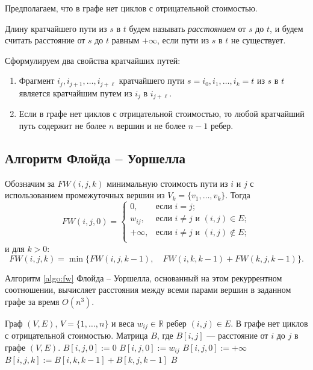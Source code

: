 \documentclass[a4paper,12pt]{article}
\begin{document}
Предполагаем, что в графе нет циклов с отрицательной стоимостью.

Длину кратчайшего пути из $s$ в $t$ будем называть \emph{расстоянием} от $s$ до $t$, и будем считать расстояние от $s$ до $t$ равным $+\infty$, если пути из $s$ в $t$ не существует.

Сформулируем два свойства кратчайших путей:
\begin{enumerate}
	\item Фрагмент $i_j, i_{j+1}, \dots, i_{j+\ell}$ кратчайшего пути $s = i_0, i_1, \ldots, i_k = t$ из $s$ в $t$ является кратчайшим путем из $i_j$ в $i_{j+\ell}$.
	\item Если в графе нет циклов с отрицательной стоимостью, то любой кратчайший путь содержит не более $n$ вершин и не более $n - 1$ ребер.
\end{enumerate}


\subsection{Алгоритм Флойда -- Уоршелла}
Обозначим за $FW(i, j, k)$ минимальную стоимость пути из $i$ и $j$ с использованием промежуточных вершин из $V_k = \{v_1, \ldots, v_k\}$. Тогда
\[FW(i, j, 0) =
	\begin{cases}
		0, & \text{если }i = j;\\
		w_{ij}, & \text{если }i \neq j\text{ и }(i, j) \in E;\\
		+\infty, & \text{если }i \neq j\text{ и }(i, j) \not\in E;\\
	\end{cases}
\]
и для $k > 0$:
\[FW(i, j, k) = \min\{FW(i, j, k-1), \quad FW(i, k, k-1) + FW(k, j, k - 1)\}.\]

Алгоритм \ref{algo:fw} Флойда -- Уоршелла, основанный на этом рекуррентном соотношении, вычисляет расстояния между всеми парами вершин в заданном графе за время $O(n^3)$.

\begin{algorithm}
  	\caption{($(V, E), w_{ij}$)}
	\label{algo:fw}
	\begin{algorithmic}%
		\Require Граф $(V, E)$, $V = \{1, \dots, n\}$ и веса $w_{ij} \in \mathbb{R}$ ребер $(i, j) \in E$. В графе нет циклов с отрицательной стоимостью.
		\Ensure Матрица $B$, где $B[i, j]$ --- расстояние от $i$ до $j$ в графе $(V, E)$.
		\State
					\State $B[i, j, 0] := 0$
					\State $B[i, j, 0] := w_{ij}$
				\Else
					\State $B[i, j, 0] := +\infty$
				\EndIf
			\EndFor
		\EndFor
		\State
						\State $B[i, j, k] := B[i, k, k-1] + B[k, j, k-1]$
					\EndIf
				\EndFor
			\EndFor
		\EndFor
		\State
		\Return $B$
	\end{algorithmic}
\end{algorithm}
\end{document}
